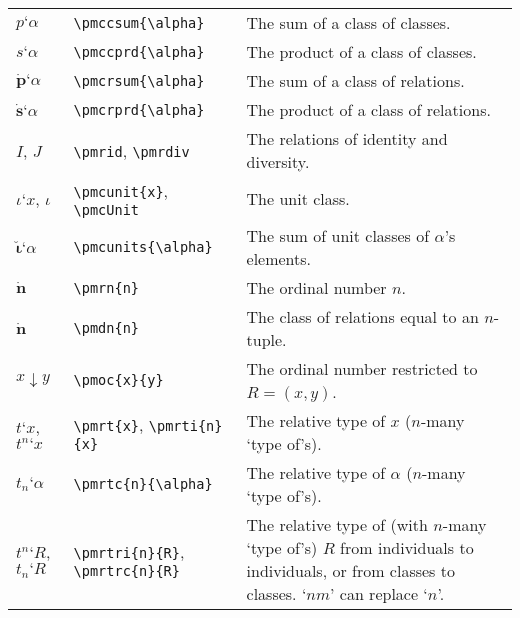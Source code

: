 \documentclass[12pt]{article}
\newcommand{\pmbreve}[1]{\boldsymbol{\breve{\text{$#1$}}}}
\newcommand{\pmcirc}[1]{\boldsymbol{\dot{\text{$#1$}}}}
\newcommand{\pmccsum}[1]{p\textbf{`}#1} %
\newcommand{\pmccprd}[1]{s\textbf{`}#1} %
\newcommand{\pmcrsum}[1]{\pmcirc{p}\textbf{`}#1} %
\newcommand{\pmcrprd}[1]{\pmcirc{s}\textbf{`}#1} %
\newcommand{\pmrid}{I} %
\newcommand{\pmrdiv}{J} %
\newcommand{\pmcunit}[1]{\iota\textbf{`}#1} %
\newcommand{\pmcUnit}{\iota}
\newcommand{\pmcunits}[1]{\pmbreve{\iota}\textbf{`}#1} %
\newcommand{\pmoc}[2]{#1 \boldsymbol{\downarrow} #2} %
\newcommand{\pmdn}[1]{\pmcirc{#1}} %
\newcommand{\pmrt}[1]{t\textbf{`}#1} %
\newcommand{\pmrti}[2]{t^{#1}\textbf{`}#2} %
\newcommand{\pmrtc}[2]{t_{#1}\textbf{`}#2} %
\newcommand{\pmrtri}[2]{t^{#1}\textbf{`}#2} %
\newcommand{\pmrtrc}[2]{t_{#1}\textbf{`}#2} %
\newcommand{\pmrn}[1]{\pmcirc{#1}} %
\begin{document}
\begin{tabular}{@{}p{3cm} | p{5cm} | p{8.25cm}}
	$\pmccsum{\alpha}$ & \verb|\pmccsum{\alpha}| & The sum of a class of classes. \\
	$\pmccprd{\alpha}$ & \verb|\pmccprd{\alpha}| & The product of a class of classes. \\
	$\pmcrsum{\alpha}$ & \verb|\pmcrsum{\alpha}| & The sum of a class of relations. \\
	$\pmcrprd{\alpha}$ & \verb|\pmcrprd{\alpha}| & The product of a class of relations. \\
	$\pmrid$, $\pmrdiv$ & \verb|\pmrid|, \verb|\pmrdiv| & The relations of identity and diversity. \\
	$\pmcunit{x}$, $\pmcUnit$ & \verb|\pmcunit{x}|, \verb|\pmcUnit| & The unit class. \\
	$\pmcunits{\alpha}$ & \verb|\pmcunits{\alpha}| & The sum of unit classes of $\alpha$'s elements. \\
	$\pmrn{n}$ & \verb|\pmrn{n}| & The ordinal number $n$. \\
	$\pmdn{n}$ & \verb|\pmdn{n}| & The class of relations equal to an $n$-tuple. \\
	$\pmoc{x}{y}$ & \verb|\pmoc{x}{y}| & The ordinal number restricted to $R=(x,y)$. \\
	$\pmrt{x}$, $\pmrti{n}{x}$ & \verb|\pmrt{x}|, \verb|\pmrti{n}{x}| & The relative type of $x$ ($n$-many `type of's). \\
	$\pmrtc{n}{\alpha}$ & \verb|\pmrtc{n}{\alpha}| & The relative type of $\alpha$ ($n$-many `type of's). \\
	$\pmrtri{n}{R}$, $\pmrtrc{n}{R}$ & \verb|\pmrtri{n}{R}|,  \verb|\pmrtrc{n}{R}| & The relative type of (with $n$-many `type of's) $R$ from individuals to individuals, or from classes to classes. `$nm$' can replace `$n$'. 
\end{tabular}
\end{document}
